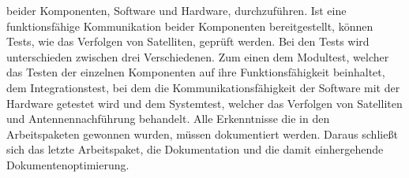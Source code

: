 beider Komponenten, Software und Hardware, durchzuführen. Ist eine funktionsfähige Kommunikation beider Komponenten bereitgestellt, können Tests, wie 
das Verfolgen von Satelliten, geprüft werden. Bei den Tests wird unterschieden zwischen drei Verschiedenen. Zum einen dem Modultest, welcher das Testen der einzelnen Komponenten auf ihre Funktionsfähigkeit beinhaltet, dem Integrationstest, bei dem die Kommunikationsfähigkeit der Software mit der Hardware getestet wird und dem Systemtest, welcher das Verfolgen von Satelliten und Antennennachführung behandelt. Alle Erkenntnisse die in den Arbeitspaketen gewonnen wurden, müssen dokumentiert werden. Daraus schließt sich das letzte 
Arbeitspaket, die Dokumentation und die damit einhergehende Dokumentenoptimierung.